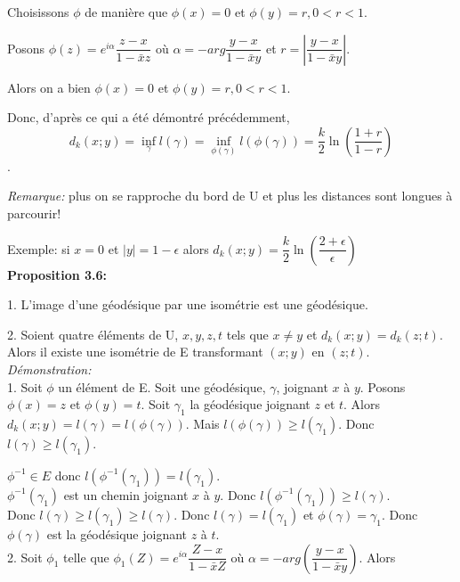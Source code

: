 \documentclass[a4paper, 12pt, twoside]{book}
\begin{document}
  Choisissons $\phi$ de manière que $\phi(x)=0$ et $\phi(y)=r, 0<r<1$.\
  
  Posons $\phi(z)=e^{i\alpha}\dfrac{z-x}{1-\bar{x}z}$ où $\alpha=-arg\dfrac{y-x}{1-\bar{x}y}$ et $r=|\dfrac{y-x}{1-\bar{x}y}|$.\
  
  Alors on a bien $\phi(x)=0$ et $\phi(y)=r, 0<r<1$.\
  
  Donc, d'après ce qui a été démontré précédemment, $$d_{k}(x; y)=\inf_{\gamma}l(\gamma)=\inf_{\phi(\gamma)}l(\phi(\gamma))=\dfrac{k}{2}\ln(\dfrac{1+r}{1-r})$$.\
  
  \textit{Remarque:} plus on se rapproche du bord de U et plus les distances sont longues à parcourir!\
  
  Exemple: si $x=0$ et $|y|=1-\epsilon$ alors $d_{k}(x;y)=\dfrac{k}{2}\ln(\dfrac{2+\epsilon}{\epsilon})$\\
  
  \textbf{Proposition 3.6:}\
  
 1. L'image d'une géodésique par une isométrie est une géodésique.\
 
 2. Soient quatre éléments de U, $x, y, z, t$ tels que $x\neq y$ et $d_{k}(x; y)=d_{k}(z; t)$. Alors il existe une isométrie de E transformant $(x; y)$ en $(z; t)$.\\
 
 \textit{Démonstration:}\\
 
 1. Soit $\phi$ un élément de E. Soit une géodésique, $\gamma$, joignant $x$ à $y$. Posons $\phi(x)=z$ et $\phi(y)=t$. Soit $\gamma_{1}$ la géodésique joignant $z$ et $t$. Alors\\
 
 $d_{k}(x; y)=l(\gamma)=l(\phi(\gamma))$. Mais $l(\phi(\gamma))\geq l(\gamma_{1})$. Donc $l(\gamma)\geq l(\gamma_{1})$.\
 
  $\phi^{-1}\in E$ donc $l(\phi^{-1}(\gamma_{1}))= l(\gamma_{1})$.\\
 
 $\phi^{-1}(\gamma_{1})$ est un chemin joignant $x$ à $y$. Donc $l(\phi^{-1}(\gamma_{1}))\geq l(\gamma)$. \\
 
 Donc $l(\gamma)\geq l(\gamma_{1})\geq l(\gamma)$. Donc  $l(\gamma)= l(\gamma_{1})$ et $\phi(\gamma)= \gamma_{1}$. Donc $\phi(\gamma)$ est la géodésique joignant $z$ à $t$.\\
 
 2. Soit $\phi_{1}$ telle que $\phi_{1}(Z)=e^{i\alpha}\dfrac{Z-x}{1-\bar{x}Z}$ où $\alpha=-arg(\dfrac{y-x}{1-\bar{x}y})$. Alors\
 
\end{document}

